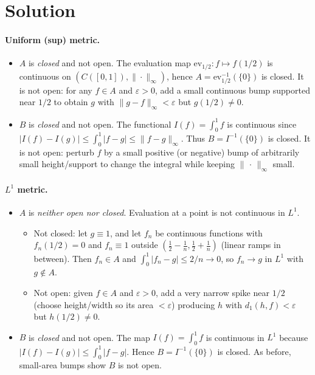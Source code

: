 \documentclass[12pt,a4paper]{article}
\begin{document}
\section*{Solution}

\paragraph{Uniform (sup) metric.}
\begin{itemize}
	\item[(a)] $A$ is \emph{closed} and not open. The evaluation map $\mathrm{ev}_{1/2}:f\mapsto f(1/2)$ is continuous on $(C([0,1]),\|\cdot\|_\infty)$, hence $A=\mathrm{ev}_{1/2}^{-1}(\{0\})$ is closed. It is not open: for any $f\in A$ and $\varepsilon>0$, add a small continuous bump supported near $1/2$ to obtain $g$ with $\|g-f\|_\infty<\varepsilon$ but $g(1/2)\ne 0$.
	\item[(b)] $B$ is \emph{closed} and not open. The functional $I(f)=\int_0^1 f$ is continuous since $|I(f)-I(g)|\le \int_0^1 |f-g|\le \|f-g\|_\infty$. Thus $B=I^{-1}(\{0\})$ is closed. It is not open: perturb $f$ by a small positive (or negative) bump of arbitrarily small height/support to change the integral while keeping $\|\,\cdot\,\|_\infty$ small.
\end{itemize}

\paragraph{$L^1$ metric.}
\begin{itemize}
	\item[(a)] $A$ is \emph{neither open nor closed}. Evaluation at a point is not continuous in $L^1$.
	\begin{itemize}
		\item Not closed: let $g\equiv 1$, and let $f_n$ be continuous functions with $f_n(1/2)=0$ and $f_n\equiv 1$ outside $(\tfrac12-\tfrac1n,\tfrac12+\tfrac1n)$ (linear ramps in between). Then $f_n\in A$ and $\int_0^1|f_n-g|\le 2/n\to0$, so $f_n\to g$ in $L^1$ with $g\notin A$.
		\item Not open: given $f\in A$ and $\varepsilon>0$, add a very narrow spike near $1/2$ (choose height/width so its area $<\varepsilon$) producing $h$ with $d_1(h,f)<\varepsilon$ but $h(1/2)\ne 0$.
	\end{itemize}
	\item[(b)] $B$ is \emph{closed} and not open. The map $I(f)=\int_0^1 f$ is continuous in $L^1$ because $|I(f)-I(g)|\le \int_0^1|f-g|$. Hence $B=I^{-1}(\{0\})$ is closed. As before, small-area bumps show $B$ is not open.
\end{itemize}
\end{document}

